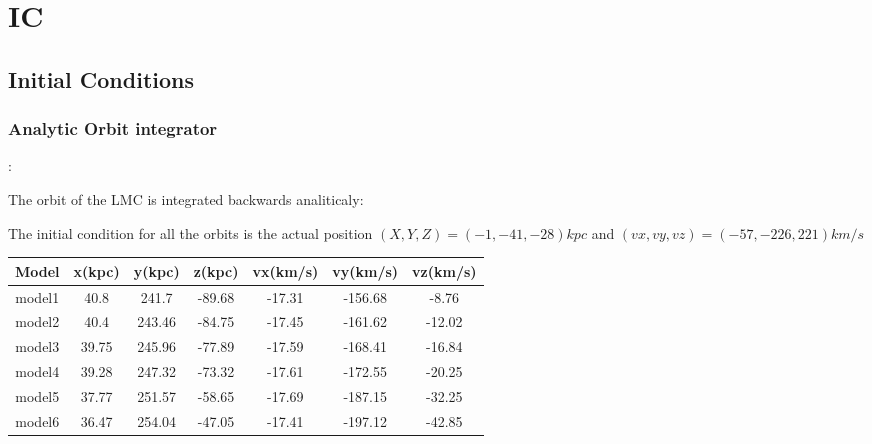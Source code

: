 \chapter{IC}\label{sec:IC}
\section{Initial Conditions}

\subsection{Analytic Orbit integrator}:

The orbit of the LMC is integrated backwards analiticaly:

The initial condition for all the orbits is the actual position 
$(X, Y, Z) = (-1, -41, -28)kpc$ and $(vx, vy, vz) = (-57, -226, 221)km/s$

\begin{table}
\begin{tabular}{c c c c c c c}
Model & x(kpc) & y(kpc) & z(kpc) &vx(km/s) & vy(km/s) & vz(km/s)\\
\hline
model1 & 40.8 & 241.7 & -89.68  & -17.31 & -156.68 & -8.76 \\
model2 & 40.4 & 243.46 & -84.75 & -17.45 & -161.62 & -12.02 \\
model3 & 39.75 & 245.96 & -77.89 & -17.59 & -168.41 & -16.84 \\     
model4 & 39.28 & 247.32 & -73.32 & -17.61 & -172.55 & -20.25 \\
model5 & 37.77 & 251.57 & -58.65 & -17.69 & -187.15 & -32.25 \\ 
model6 & 36.47 & 254.04 & -47.05 & -17.41 & -197.12 & -42.85 \\
\end{tabular}
\end{table}
